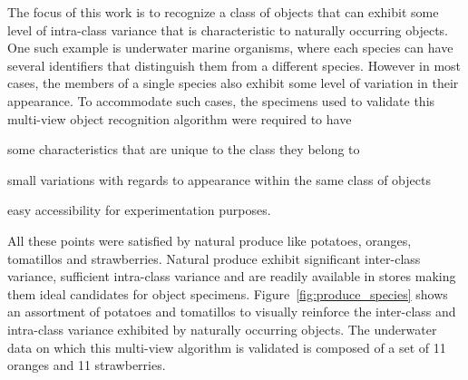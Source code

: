 \documentclass {udthesis}
\begin{document}
The focus of this work is to recognize a class of objects that can exhibit some level of intra-class variance that is characteristic to naturally occurring objects. One such example is underwater marine organisms, where each species can have several identifiers that distinguish them from a different species. However in most cases, the members of a single species also exhibit some level of variation in their appearance. To accommodate such cases, the specimens used to validate this multi-view object recognition algorithm were required to have \begin{enumerate*}[label=(\roman*)]  \item some characteristics that are unique to the class they belong to \item small variations with regards to appearance within the same class of objects \item easy accessibility for experimentation purposes. \end{enumerate*} All these points were satisfied by natural produce like potatoes, oranges, tomatillos and strawberries. Natural produce exhibit significant inter-class variance, sufficient intra-class variance and are readily 
available in stores making them ideal 
candidates for object specimens. Figure~\ref{fig:produce_species} shows an assortment of potatoes and tomatillos to visually reinforce the inter-class and intra-class variance exhibited by naturally occurring objects. The underwater data on which this multi-view algorithm is validated is composed of a set of 11 oranges and 11 strawberries.
%
\end{document}
